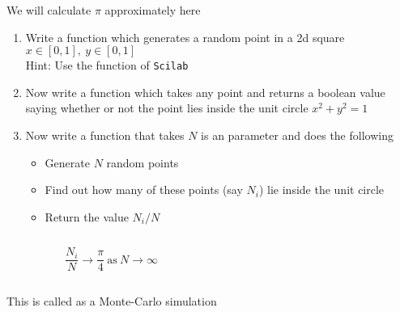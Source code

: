 \documentclass[%
    10pt,
    xcolor={dvipsnames},
    compress, %
]{beamer}
\newcommand{\hint}[1]{{\small\alert{Hint: #1}}}
\newcommand{\scilab}{\texttt{Scilab}}
\begin{document}
\begin{frame}[fragile]
    \begin{exercise}
        We will calculate $\pi$ approximately here
        \begin{enumerate}
            \item Write a function  which generates a random point in a 2d square $x \in [0,1],\ y \in [0,1]$\\
            \hint{Use the  function of \scilab}
            \item<2-> Now write a function  which takes any point and returns a boolean value saying whether or not the point lies inside the unit circle $x^2+y^2=1$
            \item<3-> Now write a function  that takes $N$ is an parameter and does the following
            \begin{itemize}
                \item Generate $N$ random points
                \item Find out how many of these points (say $N_i$) lie inside the unit circle
                \item Return the value $N_i/N$
            \end{itemize}
        \end{enumerate}
        \begin{columns}
            \begin{column}{0.5\linewidth}
                \begin{equation*}
                    \frac{N_i}{N} \to \frac{\pi}{4}\ \text{as}\ N \to \infty
                \end{equation*}
            \end{column}
            \begin{column}{0.5\linewidth}
                \begin{figure}
                    \centering
                \end{figure}
            \end{column}
        \end{columns}
        This is called as a Monte-Carlo simulation
    \end{exercise}
\end{frame}
\end{document}
